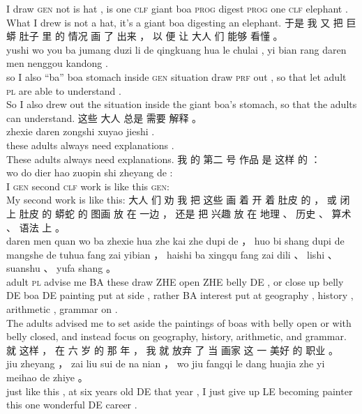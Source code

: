 \documentclass[UTF8]{ctexart}
\begin{document}
\begin{exe}
I draw \textsc{gen} not is hat , is one \textsc{clf} {giant boa} \textsc{prog} digest \textsc{prog} one \textsc{clf} elephant . 
\\
\trans What I drew is not a hat, it's a giant boa digesting an elephant. 
\ex
\glll
于是 我 又 把 巨蟒 肚子 里 的 情况 画 了 出来 ， 以 便 让 大人 们 能够 看懂 。\\
yushi wo you ba jumang duzi li de qingkuang hua le chulai , yi bian rang daren men nenggou kandong . 
\\
so I also ``ba'' boa stomach inside \textsc{gen} situation draw \textsc{prf} out , {} {so that} let adult \textsc{pl} {are able to} {understand} . 
\\
\trans So I also drew out the situation inside the giant boa's stomach, so that the adults can understand. 
\ex
\glll
这些 大人 总是 需要 解释 。\\
zhexie daren zongshi xuyao jieshi . 
\\
these adults always need explanations .
\\
\trans These adults always need explanations.
\ex
\glll
我 的 第二 号 作品 是 这样 的 ：\\
wo do dier hao zuopin shi zheyang de :
\\
I \textsc{gen} second \textsc{clf} work is {like this} \textsc{gen}:
\\
\trans My second work is like this:
\ex
\glll
大人 们 劝 我 把 这些 画 着 开 着 肚皮 的 ， 或 闭 上 肚皮 的 蟒蛇 的 图画 放 在 一边 ， 还是 把 兴趣 放 在 地理 、 历史 、 算术 、 语法 上 。\\
daren men quan wo ba zhexie hua zhe kai zhe dupi de ， huo bi shang dupi de mangshe de tuhua fang zai yibian ， haishi ba xingqu fang zai dili 、 lishi 、 suanshu 、 yufa shang 。
\\
adult \textsc{pl} advise me BA these draw ZHE open ZHE belly DE , or close up belly DE boa DE painting put at side , rather BA interest put at geography , history , arithmetic , grammar on .
\\
\trans The adults advised me to set aside the paintings of boas with belly open or with belly closed, and instead focus on geography, history, arithmetic, and grammar. 
\ex
\glll
就 这样 ， 在 六 岁 的 那 年 ， 我 就 放弃 了 当 画家 这 一 美好 的 职业 。\\
jiu zheyang ， zai liu sui de na nian ， wo jiu fangqi le dang huajia zhe yi meihao de zhiye 。
\\
just {like this} , at six {years old} DE that year , I just {give up} LE becoming painter this one wonderful DE career .

\end{exe}
\end{document}
